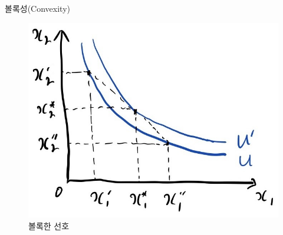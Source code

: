 \documentclass[aspectratio=169,xcolor=dvipsnames,handout]{beamer}
\begin{document}
\begin{frame}{볼록성(Convexity)}
    \begin{figure}
        \centering
        \includegraphics[scale=.3]{pic/convexity.jpg}
        \caption{볼록한 선호}
    \end{figure}
\end{frame}
\end{document}
